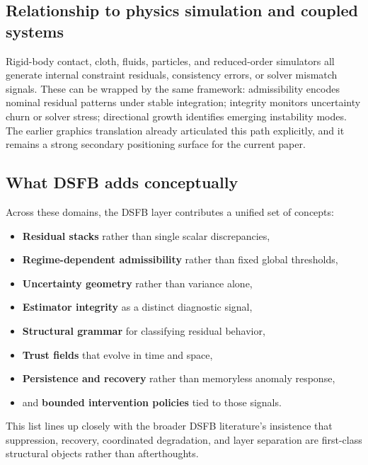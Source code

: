 \documentclass[11pt,letterpaper]{article}
\theoremstyle{gcresult}
\theoremstyle{definition}
\begin{document}

\subsection{Relationship to physics simulation and coupled systems}

Rigid-body contact, cloth, fluids, particles, and reduced-order simulators all generate internal constraint residuals, consistency errors, or solver mismatch signals. These can be wrapped by the same framework: admissibility encodes nominal residual patterns under stable integration; integrity monitors uncertainty churn or solver stress; directional growth identifies emerging instability modes. The earlier graphics translation already articulated this path explicitly, and it remains a strong secondary positioning surface for the current paper. 


\subsection{What DSFB adds conceptually}

Across these domains, the DSFB layer contributes a unified set of concepts:
\begin{itemize}[leftmargin=1.5em]
    \item \textbf{Residual stacks} rather than single scalar discrepancies,
    \item \textbf{Regime-dependent admissibility} rather than fixed global thresholds,
    \item \textbf{Uncertainty geometry} rather than variance alone,
    \item \textbf{Estimator integrity} as a distinct diagnostic signal,
    \item \textbf{Structural grammar} for classifying residual behavior,
    \item \textbf{Trust fields} that evolve in time and space,
    \item \textbf{Persistence and recovery} rather than memoryless anomaly response,
    \item and \textbf{bounded intervention policies} tied to those signals.
\end{itemize}

This list lines up closely with the broader DSFB literature’s insistence that suppression, recovery, coordinated degradation, and layer separation are first-class structural objects rather than afterthoughts. 
\end{document}
